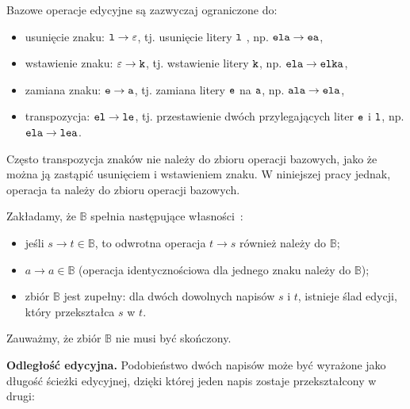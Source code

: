 \documentclass{praca1}
\begin{document}
Bazowe operacje edycyjne są zazwyczaj ograniczone do:
\begin{itemize}
\item usunięcie znaku: $\verb|l| \rightarrow \varepsilon$, tj. usunięcie litery $\verb|l|$ , np. $\verb|ela| \rightarrow \verb|ea|$,
\item wstawienie znaku: $\varepsilon \rightarrow \verb|k|$, tj. wstawienie litery $\verb|k|$, np. $\verb|ela| \rightarrow \verb|elka|$,
\item zamiana znaku: $\verb|e| \rightarrow \verb|a|$, tj. zamiana litery $\verb|e|$ na $\verb|a|$, np. $\verb|ala| \rightarrow \verb|ela|$,
\item transpozycja: $\verb|el| \rightarrow \verb|le|$, tj. przestawienie dwóch przylegających liter $\verb|e|$ i $\verb|l|$, np. $\verb|ela| \rightarrow \verb|lea|$.
\end{itemize}

Często transpozycja znaków nie należy do zbioru operacji bazowych, jako że można ją zastąpić usunięciem i wstawieniem znaku. W niniejszej pracy jednak, operacja ta należy do zbioru operacji bazowych.


\begin{property}\label{wl:001}
Zakładamy, że $\mathbb{B}$ spełnia następujące własności~\cite{Boytsov2011:indexingmethods}:
\begin{itemize}
\item jeśli $s \rightarrow t \in \mathbb{B}$, to odwrotna operacja $t \rightarrow s$ również należy do $\mathbb{B}$;
\item $a \rightarrow a \in \mathbb{B}$ (operacja identycznościowa dla jednego znaku należy do $\mathbb{B}$);
\item zbiór $\mathbb{B}$ jest zupełny: dla dwóch dowolnych napisów $s$ i $t$, istnieje ślad edycji, który przekształca $s$ w $t$.
\end{itemize}
\end{property}

Zauważmy, że zbiór $\mathbb{B}$ nie musi być skończony.

\textbf{Odległość edycyjna.} Podobieństwo dwóch napisów może być wyrażone jako długość ścieżki edycyjnej, dzięki której jeden napis zostaje przekształcony w drugi:
\end{document}
